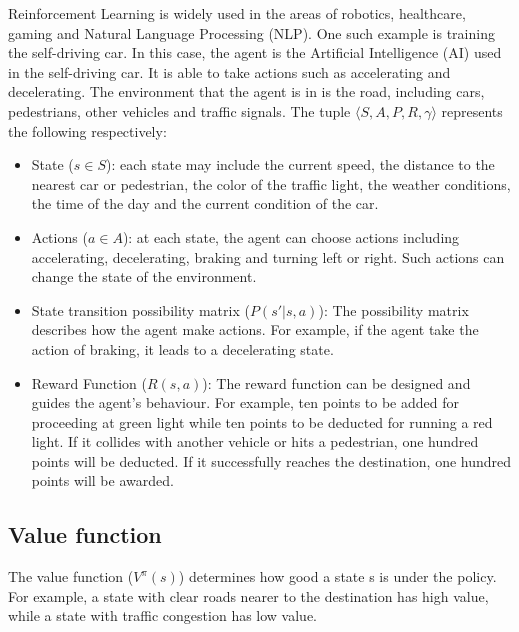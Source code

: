 \documentclass{article} %
\begin{document}
Reinforcement Learning is widely used in the areas of robotics, healthcare, gaming and Natural Language Processing (NLP). One such example is training the self-driving car. In this case, the agent is the Artificial Intelligence (AI) used in the self-driving car. It is able to take actions such as accelerating and decelerating. The environment that the agent is in is the road, including cars, pedestrians, other vehicles and traffic signals. The tuple \(\langle S, A, P, R, \gamma \rangle\) represents the following respectively:
\begin{itemize}
    \item State (\(s \in S\)): 
each state may include the current speed, the distance to the nearest car or pedestrian, the color of the traffic light, the weather conditions, the time of the day and the current condition of the car.
\end{itemize}
\begin{itemize}
    \item Actions (\(a \in A\)): 
at each state, the agent can choose actions including accelerating, decelerating, braking and turning left or right. Such actions can change the state of the environment.
\end{itemize}
\begin{itemize}
    \item State transition possibility matrix (\( P(s' | s, a) \)): 
The possibility matrix describes how the agent make actions. For example, if the agent take the action of braking, it leads to a decelerating state.
\end{itemize}
\begin{itemize}
    \item Reward Function (\( R(s, a) \)): 
The reward function can be designed and guides the agent's behaviour. For example, ten points to be added for proceeding at green light while ten points to be deducted for running a red light. If it collides with another vehicle or hits a pedestrian, one hundred points will be deducted. If it successfully reaches the destination, one hundred points will be awarded. 
\end{itemize}


\subsection{Value function}
The value function (\(V^{\pi}(s)\)) determines how good a state s is under the policy. For example, a state with clear roads nearer to the destination has high value, while a state with traffic congestion has low value.
\end{document}
